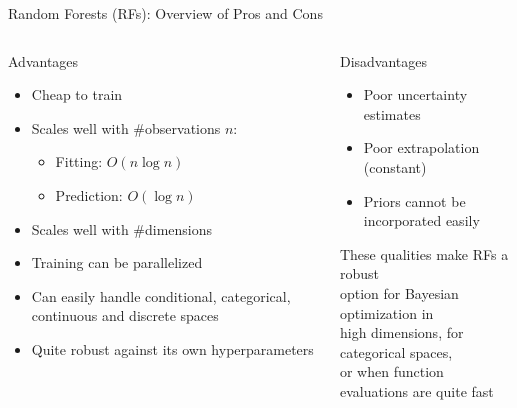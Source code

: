 \begin{frame}[c]{Random Forests (RFs): Overview of Pros and Cons}

\begin{columns}[T] %
\begin{column}{.48\textwidth}

    \begin{block}{Advantages}
    \begin{itemize}
        \item Cheap to train 
        \item Scales well with \#observations $n$: 
        \begin{itemize}
        	\item Fitting: $O(n \log n)$ 
        	\item Prediction: $O(\log n)$
        \end{itemize}
        \item Scales well with \#dimensions
        \item Training can be parallelized 
        \item Can easily handle conditional, categorical, continuous and discrete spaces 
        \item Quite robust against its own hyperparameters
    \end{itemize}
    \end{block}
\end{column}%

\hfill%
\fhpause

\begin{column}{.48\textwidth}
    \begin{block}{Disadvantages}
    \begin{itemize}
        \item Poor uncertainty estimates 
        \item Poor extrapolation (constant) 
    	\item Priors cannot be incorporated easily 
    \end{itemize}
    \end{block}

\fhpause
\bigskip
\bigskip
\hspace*{0.5cm}These qualities make RFs a \alert{robust} \\
\hspace*{0.5cm}\alert{option} for Bayesian optimization in \\ \hspace*{0.5cm}\alert{high dimensions}, for \alert{categorical spaces},\\
\hspace*{0.5cm}or when function evaluations are quite fast

\end{column}
\end{columns}

\end{frame}
